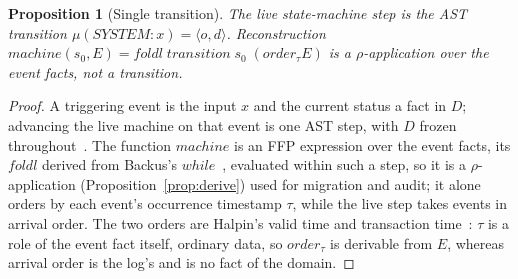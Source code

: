 \documentclass[10pt,twocolumn]{article}
\theoremstyle{plain}
\newtheorem{proposition}{Proposition}
\theoremstyle{definition}
\begin{document}
\begin{proposition}[Single transition]\label{prop:onestep}
The live state-machine step is the AST transition $\mu(\mathit{SYSTEM}\!:\!x)=\langle o,d\rangle$. Reconstruction $\mathit{machine}(s_0,E)=\mathit{foldl}\;\mathit{transition}\;s_0\;(\mathit{order}_\tau E)$ is a $\rho$-application over the event facts, not a transition.
\end{proposition}
\begin{proof}
A triggering event is the input $x$ and the current status a fact in $D$; advancing the live machine on that event is one AST step, with $D$ frozen throughout~\cite[Secs.\,14.3.1,\,14.6]{backus78}. The function $\mathit{machine}$ is an FFP expression over the event facts, its $\mathit{foldl}$ derived from Backus's $\mathit{while}$~\cite[Sec.\,11.2.4]{backus78}, evaluated within such a step, so it is a $\rho$-application (Proposition~\ref{prop:derive}) used for migration and audit; it alone orders by each event's occurrence timestamp $\tau$, while the live step takes events in arrival order. The two orders are Halpin's valid time and transaction time~\cite[Sec.\,10.3]{halpin08}: $\tau$ is a role of the event fact itself, ordinary data, so $\mathit{order}_\tau$ is derivable from $E$, whereas arrival order is the log's and is no fact of the domain.
\end{proof}
\end{document}
